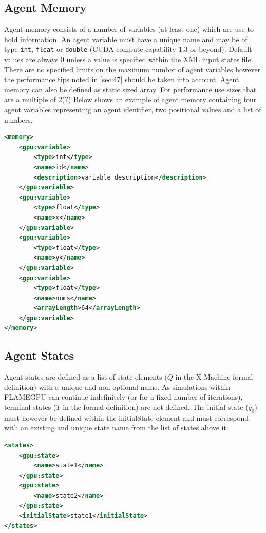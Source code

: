 \documentclass[11pt, a4paper, onecolumn, oneside]{report}
\begin{document}
\subsection{Agent Memory}
\label{sec:231}


Agent memory consists of a number of variables (at least one) which are use to hold information.
An agent variable must have a unique name and may be of type \texttt{int}, \texttt{float} or \texttt{double} (CUDA compute capability 1.3 or beyond).
Default values are always $0$ unless a value is specified within the XML input states file.
There are no specified limits on the maximum number of agent variables however the performance tips noted in \cref{sec:47} should be taken into account.
Agent memory can also be defined as static sized array. For performance use sizes that are a multiple of 2(?)
Below shows an example of agent memory containing four agent variables representing an agent identifier, two positional values and a list of numbers.

\begin{lstlisting}[language=XML]
<memory>
    <gpu:variable>
        <type>int</type>
        <name>id</name>
        <description>variable description</description>
    </gpu:variable>
    <gpu:variable>
        <type>float</type>
        <name>x</name>
    </gpu:variable>
    <gpu:variable>
        <type>float</type>
        <name>y</name>
    </gpu:variable>
    <gpu:variable>
        <type>float</type>
        <name>nums</name>
        <arrayLength>64</arrayLength>
    </gpu:variable>
</memory>
\end{lstlisting}


\subsection{Agent States}
\label{sec:232}

Agent states are defined as a list of state elements ($Q$ in the X-Machine formal definition) with a unique and non optional name.
As simulations within FLAMEGPU can continue indefinitely (or for a fixed number of iterations), terminal states ($T$ in the formal definition) are not defined.
The initial state ($q_{0}$) must however be defined within the initialState element and must correspond with an existing and unique state name from the list of states above it.

\begin{lstlisting}[language=XML]
<states>
    <gpu:state>
        <name>state1</name>
    </gpu:state>
    <gpu:state>
        <name>state2</name>
    </gpu:state>
    <initialState>state1</initialState>
</states>
\end{lstlisting}
\end{document}
